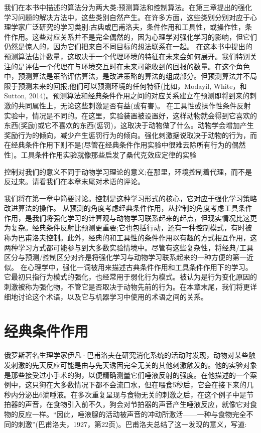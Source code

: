 我们在本书中描述的算法分为两大类:预测算法和控制算法。在第三章提出的强化学习问题的解决方法中，这些类别自然产生。在许多方面，这些类别分别对应于心理学家广泛研究的学习类别:古典或巴甫洛夫，条件作用和工具性，或操作性，条件作用。这些对应关系并不是完全偶然的，因为心理学对强化学习的影响，但它们仍然是惊人的，因为它们把来自不同目标的想法联系在一起。
在这本书中提出的预测算法估计数量，这取决于一个代理环境的特征在未来会如何展开。我们特别关注的是评估一个代理在与环境交互时在未来可能收到的回报的数量。在这个角色中，预测算法是策略评估算法，是改进策略的算法的组成部分。但预测算法并不局限于预测未来的回报;他们可以预测环境的任何特征(比如，Modayil, White，和Sutton, 2014)。预测算法和经典条件作用之间的对应关系建立在预测即将到来的刺激的共同属性上，无论这些刺激是否有益(或有害)。
在工具性或操作性条件反射实验中，情况是不同的。在这里，实验装置被设置好，这样动物就会得到它喜欢的东西(奖励)或它不喜欢的东西(惩罚)，这取决于动物做了什么。动物学会增加产生奖励行为的倾向，减少产生惩罚行为的倾向。强化刺激据说取决于动物的行为，而在经典条件作用下则不是(尽管在经典条件作用实验中很难去除所有行为的偶然性)。工具条件作用实验就像那些启发了桑代克效应定律的实验

控制对我们的意义不同于动物学习理论的意义;在那里，环境控制着代理，而不是反过来。请看我们在本章末尾对术语的评论。

我们将在第一章中简要讨论。控制是这种学习形式的核心，它对应于强化学习策略改进算法的操作。
从预测的角度考虑经典条件作用，从控制的角度考虑工具条件作用，是我们将强化学习的计算观与动物学习联系起来的起点，但现实情况比这更为复杂。经典条件反射比预测更重要;它也包括行动，还有一种控制模式，有时被称为巴甫洛夫控制。此外，经典的和工具性的条件作用以有趣的方式相互作用，这两种学习方式都可能参与到大多数实验情境中。尽管有这些复杂性，将经典/工具区分与预测/控制区分对齐是将强化学习与动物学习联系起来的一种方便的第一近似。
在心理学中，强化一词被用来描述古典条件作用和工具条件作用下的学习。它最初只指行为模式的强化，也经常用于弱化行为模式。被认为是行为变化原因的刺激被称为强化物，不管它是否取决于动物先前的行为。在本章末尾，我们将更详细地讨论这个术语，以及它与机器学习中使用的术语之间的关系。

\section{经典条件作用}

俄罗斯著名生理学家伊凡·巴甫洛夫在研究消化系统的活动时发现，动物对某些触发刺激的先天反应可能是由与先天诱因完全无关的其他刺激触发的。他的实验对象是那些接受过小手术的狗，以便精确测量它们唾液反射的强度。在他描述的一个案例中，这只狗在大多数情况下都不会流口水，但在喂食5秒后，它会在接下来的几秒内分泌出6滴唾液。在多次重复呈现与食物无关的刺激之后，在这个例子中是节拍器的声音，在食物引入前不久，狗会对节拍器的声音产生唾液反应，就像它对食物的反应一样。“因此，唾液腺的活动被声音的冲动所激活——一种与食物完全不同的刺激”(巴甫洛夫，1927，第22页)。巴甫洛夫总结了这一发现的意义，写道:

